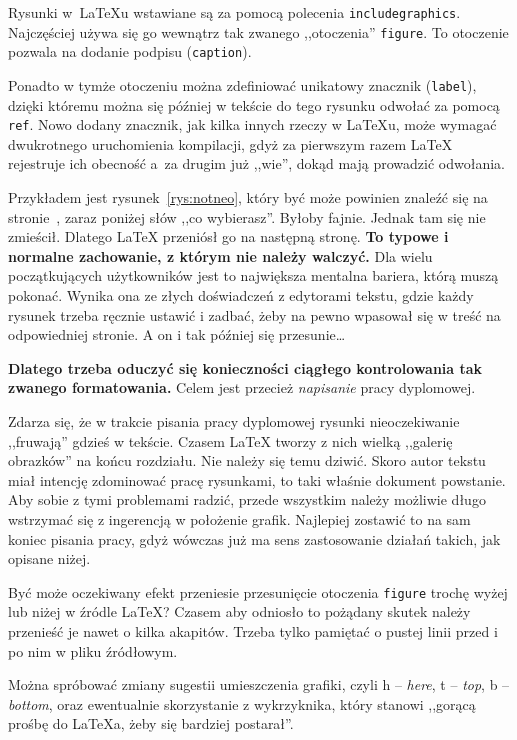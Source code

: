 Rysunki w~\LaTeX{u} wstawiane są za pomocą polecenia \texttt{includegraphics}. Najczęściej używa się go wewnątrz tak zwanego ,,otoczenia'' \texttt{figure}. To otoczenie pozwala na dodanie podpisu (\texttt{caption}).

Ponadto w tymże otoczeniu można zdefiniować unikatowy znacznik (\texttt{label}), dzięki któremu można się później w tekście do tego rysunku odwołać za pomocą \texttt{ref}. Nowo dodany znacznik, jak kilka innych rzeczy w \LaTeX{u}, może wymagać dwukrotnego uruchomienia kompilacji, gdyż za pierwszym razem \LaTeX{} rejestruje ich obecność a~za drugim już ,,wie'', dokąd mają prowadzić odwołania.

Przykładem jest rysunek~\ref{rys:notneo}, który być może powinien znaleźć się na stronie~\pageref{ch:wstep}, zaraz poniżej słów ,,co wybierasz''. Byłoby fajnie. Jednak tam się nie zmieścił. Dlatego \LaTeX{} przeniósł go na następną stronę. \textbf{To typowe i normalne zachowanie, z którym nie należy walczyć.} Dla wielu początkujących użytkowników jest to największa mentalna bariera, którą muszą pokonać. Wynika ona ze złych doświadczeń z edytorami tekstu, gdzie każdy rysunek trzeba ręcznie ustawić i zadbać, żeby na pewno wpasował się w treść na odpowiedniej stronie. A on i tak później się przesunie\ldots

\textbf{Dlatego trzeba oduczyć się konieczności ciągłego kontrolowania tak zwanego formatowania.} Celem jest przecież \textit{napisanie} pracy dyplomowej.

Zdarza się, że w trakcie pisania pracy dyplomowej rysunki nieoczekiwanie ,,fruwają'' gdzieś w tekście. Czasem \LaTeX{} tworzy z nich wielką ,,galerię obrazków'' na końcu rozdziału. Nie należy się temu dziwić. Skoro autor tekstu miał intencję zdominować pracę rysunkami, to taki właśnie dokument powstanie. Aby sobie z tymi problemami radzić, przede wszystkim należy możliwie długo wstrzymać się z ingerencją w położenie grafik. Najlepiej zostawić to na sam koniec pisania pracy, gdyż wówczas już ma sens zastosowanie działań takich, jak opisane niżej.

Być może oczekiwany efekt przeniesie przesunięcie otoczenia \texttt{figure} trochę wyżej lub niżej w źródle \LaTeX{}? Czasem aby odniosło to pożądany skutek należy przenieść je nawet o kilka akapitów. Trzeba tylko pamiętać o pustej linii przed i po nim w pliku źródłowym.

Można spróbować zmiany sugestii umieszczenia grafiki, czyli h -- \textit{here}, t -- \textit{top}, b -- \textit{bottom}, oraz ewentualnie skorzystanie z wykrzyknika, który stanowi ,,gorącą prośbę do \LaTeX{a}, żeby się bardziej postarał''.

